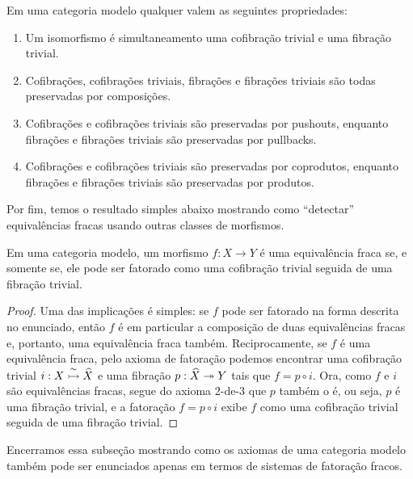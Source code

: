\begin{corol}\label{corol:propriedades_de_preservacao_categoria_modelo}
  Em uma categoria modelo qualquer valem as seguintes propriedades:
  \begin{enumerate}
  \item Um isomorfismo é simultaneamento uma cofibração trivial e uma fibração trivial.
    
  \item Cofibrações, cofibrações triviais, fibrações e fibrações triviais são todas preservadas por composições.
    
  \item Cofibrações e cofibrações triviais são preservadas por pushouts, enquanto fibrações e fibrações triviais são preservadas por pullbacks.
    
  \item Cofibrações e cofibrações triviais são preservadas por coprodutos, enquanto fibrações e fibrações triviais são preservadas por produtos.
  \end{enumerate}
\end{corol}

Por fim, temos o resultado simples abaixo mostrando como ``detectar'' equivalências fracas usando outras classes de morfismos.

\begin{lema}\label{lema:detectando_equivalencia_fraca}
  Em uma categoria modelo, um morfismo $f: X \to Y$ é uma equivalência fraca se, e somente se, ele pode ser fatorado como uma cofibração trivial seguida de uma fibração trivial.
\end{lema}

\begin{proof}
  Uma das implicações é simples: se $f$ pode ser fatorado na forma descrita no enunciado, então $f$ é em particular a composição de duas equivalências fracas e, portanto, uma equivalência fraca também.
  Reciprocamente, se $f$ é uma equivalência fraca, pelo axioma de fatoração podemos encontrar uma cofibração trivial $i: X \overset{\sim}{\rightarrowtail} \widehat{X}$ e uma fibração $p: \widehat{X} \twoheadrightarrow Y$ tais que $f = p \circ i$.
  Ora, como $f$ e $i$ são equivalências fracas, segue do axioma 2-de-3 que $p$ também o é, ou seja, $p$ é uma fibração trivial, e a fatoração $f = p \circ i$ exibe $f$ como uma cofibração trivial seguida de uma fibração trivial.
\end{proof}

Encerramos essa subseção mostrando como os axiomas de uma categoria modelo também pode ser enunciados apenas em termos de sistemas de fatoração fracos.

